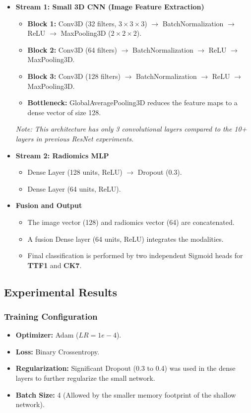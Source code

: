 \begin{itemize}
    \item \textbf{Stream 1: Small 3D CNN (Image Feature Extraction)}
    \begin{itemize}
        \item \textbf{Block 1:} Conv3D (32 filters, $3\times3\times3$) $\rightarrow$ BatchNormalization $\rightarrow$ ReLU $\rightarrow$ MaxPooling3D ($2\times2\times2$).
        \item \textbf{Block 2:} Conv3D (64 filters) $\rightarrow$ BatchNormalization $\rightarrow$ ReLU $\rightarrow$ MaxPooling3D.
        \item \textbf{Block 3:} Conv3D (128 filters) $\rightarrow$ BatchNormalization $\rightarrow$ ReLU $\rightarrow$ MaxPooling3D.
        \item \textbf{Bottleneck:} GlobalAveragePooling3D reduces the feature maps to a dense vector of size 128.
    \end{itemize}
    \textit{Note: This architecture has only 3 convolutional layers compared to the 10+ layers in previous ResNet experiments.}

    \item \textbf{Stream 2: Radiomics MLP}
    \begin{itemize}
        \item Dense Layer (128 units, ReLU) $\rightarrow$ Dropout (0.3).
        \item Dense Layer (64 units, ReLU).
    \end{itemize}

    \item \textbf{Fusion and Output}
    \begin{itemize}
        \item The image vector (128) and radiomics vector (64) are concatenated.
        \item A fusion Dense layer (64 units, ReLU) integrates the modalities.
        \item Final classification is performed by two independent Sigmoid heads for \textbf{TTF1} and \textbf{CK7}.
    \end{itemize}
\end{itemize}

\subsection{Experimental Results}

\subsubsection{Training Configuration}
\begin{itemize}
    \item \textbf{Optimizer:} Adam ($LR=1e-4$).
    \item \textbf{Loss:} Binary Crossentropy.
    \item \textbf{Regularization:} Significant Dropout (0.3 to 0.4) was used in the dense layers to further regularize the small network.
    \item \textbf{Batch Size:} 4 (Allowed by the smaller memory footprint of the shallow network).
\end{itemize}

